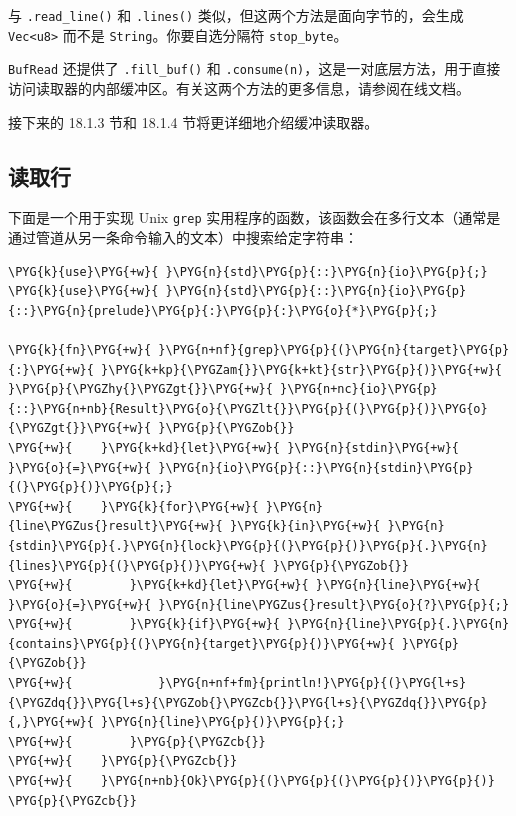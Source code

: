 与 \texttt{.read\_line()} 和 \texttt{.lines()} 类似，但这两个方法是面向字节的，会生成 \texttt{Vec<u8>} 而不是 \texttt{String}。你要自选分隔符 \texttt{stop\_byte}。

\texttt{BufRead} 还提供了 \texttt{.fill\_buf()} 和 \texttt{.consume(n)}，这是一对底层方法，用于直接访问读取器的内部缓冲区。有关这两个方法的更多信息，请参阅在线文档。

接下来的 18.1.3 节和 18.1.4 节将更详细地介绍缓冲读取器。

\subsection{读取行}

下面是一个用于实现 Unix \texttt{grep} 实用程序的函数，该函数会在多行文本（通常是通过管道从另一条命令输入的文本）中搜索给定字符串：

\begin{Verbatim}[commandchars=\\\{\},breaklines=true,breakanywhere=true,fontsize=\codefont,xleftmargin=17bp]
\PYG{k}{use}\PYG{+w}{ }\PYG{n}{std}\PYG{p}{::}\PYG{n}{io}\PYG{p}{;}
\PYG{k}{use}\PYG{+w}{ }\PYG{n}{std}\PYG{p}{::}\PYG{n}{io}\PYG{p}{::}\PYG{n}{prelude}\PYG{p}{:}\PYG{p}{:}\PYG{o}{*}\PYG{p}{;}

\PYG{k}{fn}\PYG{+w}{ }\PYG{n+nf}{grep}\PYG{p}{(}\PYG{n}{target}\PYG{p}{:}\PYG{+w}{ }\PYG{k+kp}{\PYGZam{}}\PYG{k+kt}{str}\PYG{p}{)}\PYG{+w}{ }\PYG{p}{\PYGZhy{}\PYGZgt{}}\PYG{+w}{ }\PYG{n+nc}{io}\PYG{p}{::}\PYG{n+nb}{Result}\PYG{o}{\PYGZlt{}}\PYG{p}{(}\PYG{p}{)}\PYG{o}{\PYGZgt{}}\PYG{+w}{ }\PYG{p}{\PYGZob{}}
\PYG{+w}{    }\PYG{k+kd}{let}\PYG{+w}{ }\PYG{n}{stdin}\PYG{+w}{ }\PYG{o}{=}\PYG{+w}{ }\PYG{n}{io}\PYG{p}{::}\PYG{n}{stdin}\PYG{p}{(}\PYG{p}{)}\PYG{p}{;}
\PYG{+w}{    }\PYG{k}{for}\PYG{+w}{ }\PYG{n}{line\PYGZus{}result}\PYG{+w}{ }\PYG{k}{in}\PYG{+w}{ }\PYG{n}{stdin}\PYG{p}{.}\PYG{n}{lock}\PYG{p}{(}\PYG{p}{)}\PYG{p}{.}\PYG{n}{lines}\PYG{p}{(}\PYG{p}{)}\PYG{+w}{ }\PYG{p}{\PYGZob{}}
\PYG{+w}{        }\PYG{k+kd}{let}\PYG{+w}{ }\PYG{n}{line}\PYG{+w}{ }\PYG{o}{=}\PYG{+w}{ }\PYG{n}{line\PYGZus{}result}\PYG{o}{?}\PYG{p}{;}
\PYG{+w}{        }\PYG{k}{if}\PYG{+w}{ }\PYG{n}{line}\PYG{p}{.}\PYG{n}{contains}\PYG{p}{(}\PYG{n}{target}\PYG{p}{)}\PYG{+w}{ }\PYG{p}{\PYGZob{}}
\PYG{+w}{            }\PYG{n+nf+fm}{println!}\PYG{p}{(}\PYG{l+s}{\PYGZdq{}}\PYG{l+s}{\PYGZob{}\PYGZcb{}}\PYG{l+s}{\PYGZdq{}}\PYG{p}{,}\PYG{+w}{ }\PYG{n}{line}\PYG{p}{)}\PYG{p}{;}
\PYG{+w}{        }\PYG{p}{\PYGZcb{}}
\PYG{+w}{    }\PYG{p}{\PYGZcb{}}
\PYG{+w}{    }\PYG{n+nb}{Ok}\PYG{p}{(}\PYG{p}{(}\PYG{p}{)}\PYG{p}{)}
\PYG{p}{\PYGZcb{}}
\end{Verbatim}

